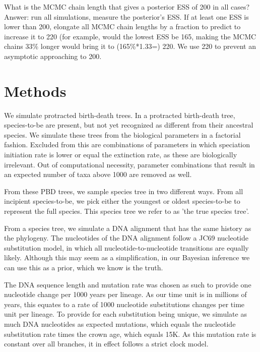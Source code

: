 \documentclass{article}
\begin{document}
What is the MCMC chain length that gives a posterior ESS of 200 in all cases?
Answer: run all simulations, measure the posterior's ESS. If at least one 
ESS is lower than 200, elongate all MCMC chain lengths by a fraction 
to predict to increase it to 220 (for example, would the lowest ESS be 165, 
making the MCMC chains 33\% longer would bring it to (165\%*1.33=) 220. We use
220 to prevent an asymptotic approaching to 200. 

\section{Methods}

We simulate protracted birth-death trees. In a protracted birth-death tree,
species-to-be are present, but not yet recognized as different from
their ancestral species. We simulate these trees from the biological parameters 
in a factorial fashion. Excluded from this are combinations of parameters in which
speciation initiation rate is lower or equal the extinction rate, as these
are biologically irrelevant. Out of computational necessity, 
parameter combinations that result in an expected number of taxa above 1000 
are removed as well.

From these PBD trees, we sample species tree in two different ways. 
From all incipient species-to-be, we pick either the youngest or oldest
species-to-be to represent the full species. This species tree we refer
to as 'the true species tree'.

From a species tree, we simulate a DNA alignment that has the same history
as the phylogeny. The nucleotides of the DNA alignment follow a JC69
nucleotide substitution model, in which all nucleotide-to-nucleotide transitions
are equally likely. Although this may seem as a simplification, in our Bayesian
inference we can use this as a prior, which we know is the truth.

The DNA sequence length and mutation rate was chosen as such to provide one
nucleotide change per 1000 years per lineage. As our time unit is in 
millions of years, this equates to a rate of 1000 nucleotide substitutions 
changes per time unit per lineage. To provide for each substitution being unique,
we simulate as much DNA nucleotides as expected mutations, which equals the
nucleotide substitution rate times the crown age, which equals 15K. As this
mutation rate is constant over all branches, it in effect follows a strict 
clock model.
\end{document}
